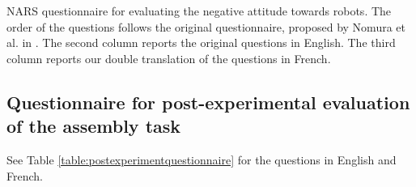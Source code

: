 \begin{table}
\caption{NARS questionnaire for evaluating the negative attitude towards robots. The order of the questions follows the original questionnaire, proposed by Nomura et al. in \cite{Nomura2006nars}. The second column reports the original questions in English. The third column reports our double translation of the questions in French.}
\label{table:nars}
\end{table}



\subsection{Questionnaire for post-experimental evaluation of the assembly task}\label{appendix:postexpquestionnaire}

See Table \ref{table:postexperimentquestionnaire} for the questions in English and French.

